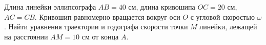 Длина линейки эллипсографа $AB=40$ см, длина кривошипа $OC=20$ см,
$AC=CB$. Кривошип равномерно вращается вокруг оси $O$ с угловой
скоростью $\omega$. Найти уравнения траектории и годографа скорости
точки $M$ линейки, лежащей на расстоянии $AM=10$ см от конца $A$.
